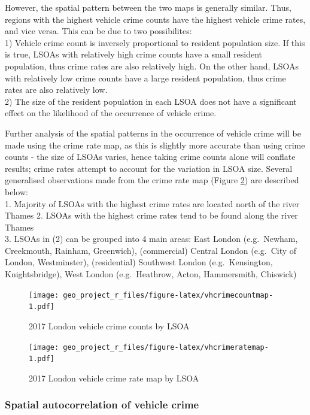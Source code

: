 \documentclass[]{article}
\theoremstyle{definition}
\theoremstyle{definition}
\theoremstyle{definition}
\theoremstyle{remark}
\begin{document}
However, the spatial pattern between the two maps is generally similar.
Thus, regions with the highest vehicle crime counts have the highest
vehicle crime rates, and vice versa. This can be due to two
possibilites:\\
1) Vehicle crime count is inversely proportional to resident population
size. If this is true, LSOAs with relatively high crime counts have a
small resident population, thus crime rates are also relatively high. On
the other hand, LSOAs with relatively low crime counts have a large
resident population, thus crime rates are also relatively low.\\
2) The size of the resident population in each LSOA does not have a
significant effect on the likelihood of the occurrence of vehicle crime.

Further analysis of the spatial patterns in the occurrence of vehicle
crime will be made using the crime rate map, as this is slightly more
accurate than using crime counts - the size of LSOAs varies, hence
taking crime counts alone will conflate results; crime rates attempt to
account for the variation in LSOA size. Several generalised observations
made from the crime rate map (Figure \ref{fig:vhcrimeratemap}) are
described below:\\
1. Majority of LSOAs with the highest crime rates are located north of
the river Thames 2. LSOAs with the highest crime rates tend to be found
along the river Thames\\
3. LSOAs in (2) can be grouped into 4 main areas: East London
(e.g.~Newham, Creekmouth, Rainham, Greenwich), (commercial) Central
London (e.g.~City of London, Westminster), (residential) Southwest
London (e.g.~Kensington, Knightsbridge), West London (e.g.~Heathrow,
Acton, Hammersmith, Chiswick)

\begin{figure}
\centering
\texttt{[image: geo\_project\_r\_files/figure-latex/vhcrimecountmap-1.pdf]}
\caption{\label{fig:vhcrimecountmap}2017 London vehicle crime counts by
LSOA}
\end{figure}

\begin{figure}
\centering
\texttt{[image: geo\_project\_r\_files/figure-latex/vhcrimeratemap-1.pdf]}
\caption{\label{fig:vhcrimeratemap}2017 London vehicle crime rate map by
LSOA}
\end{figure}

\subsubsection{Spatial autocorrelation of vehicle
crime}\label{spatial-autocorrelation-of-vehicle-crime}
\end{document}
